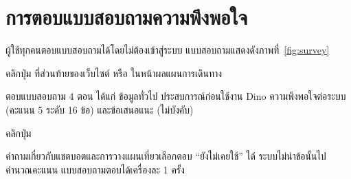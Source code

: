 \section{การตอบแบบสอบถามความพึงพอใจ}
\label{sec:survey}

ผู้ใช้ทุกคนตอบแบบสอบถามได้โดยไม่ต้องเข้าสู่ระบบ แบบสอบถามแสดงดังภาพที่~\ref{fig:survey}


\begin{steps}
  \item คลิกปุ่ม  ที่ส่วนท้ายของเว็บไซต์ หรือ  ในหน้าผลแผนการเดินทาง
  \item ตอบแบบสอบถาม 4 ตอน ได้แก่ ข้อมูลทั่วไป ประสบการณ์ก่อนใช้งาน Dino ความพึงพอใจต่อระบบ (คะแนน 5 ระดับ 16 ข้อ) และข้อเสนอแนะ (ไม่บังคับ)
  \item คลิกปุ่ม 
\end{steps}

\begin{note}
คำถามเกี่ยวกับแชตบอตและการวางแผนเที่ยวเลือกตอบ ``ยังไม่เคยใช้'' ได้ ระบบไม่นำข้อนั้นไปคำนวณคะแนน แบบสอบถามตอบได้เครื่องละ 1 ครั้ง
\end{note}
